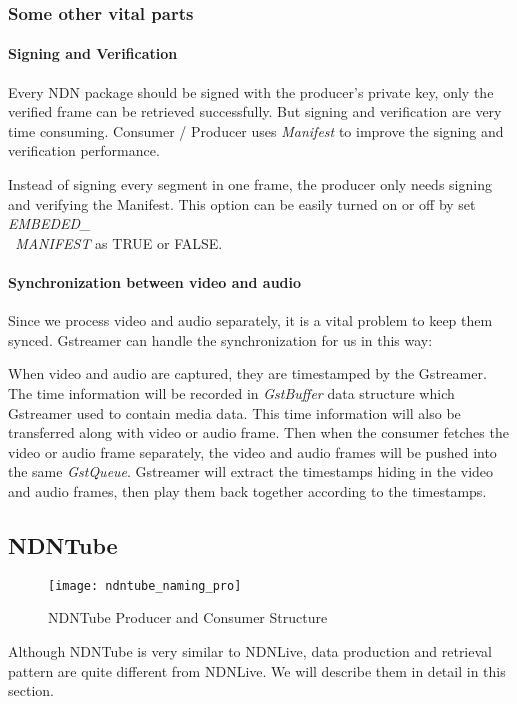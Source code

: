 \subsubsection{Some other vital parts}
\paragraph{Signing and Verification} %
\label{par:signing_and_verification}
Every NDN package should be signed with the producer's private key, only the verified frame can be retrieved successfully. But signing and verification are very time consuming. Consumer / Producer uses \textit{Manifest} \cite{api-tr} to improve the signing and verification performance. 

Instead of signing every segment in one frame, the producer only needs signing and verifying the Manifest. This option can be easily turned on or off by set \textit{EMBEDED\_\\\ MANIFEST} as TRUE or FALSE.

\paragraph{Synchronization between video and audio}
\label{par:sync}
Since we process video and audio separately, it is a vital problem to keep them synced. Gstreamer can handle the synchronization for us in this way:

When video and audio are captured, they are timestamped by the Gstreamer. The time information will be recorded in \textit{GstBuffer} data structure which Gstreamer used to contain media data. This time information will also be transferred along with video or audio frame. Then when the consumer fetches the video or audio frame separately, the video and audio frames will be pushed into the same \textit{GstQueue}. Gstreamer will extract the timestamps hiding in the video and audio frames, then play them back together according to the timestamps.

\subsection{NDNTube}
\begin{figure*}[ht]
  \centering
  \texttt{[image: ndntube\_naming\_pro]}
  \caption{NDNTube Producer and Consumer Structure}
  \label{fig:ndntube_cp}
\end{figure*}
Although NDNTube is very similar to NDNLive, data production and retrieval pattern are quite different from NDNLive. We will describe them in detail in this section.

